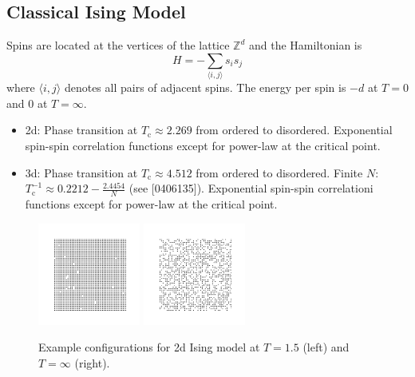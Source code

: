 \documentclass[11pt]{article}
\begin{document}
\subsection{Classical Ising Model}
Spins are located at the vertices of the lattice $\mathbb{Z}^d$ and the Hamiltonian is
\begin{equation}
    H = -\sum_{\langle i,j\rangle}s_is_j
\end{equation}
where $\langle i,j\rangle$ denotes all pairs of adjacent spins. The energy per spin is $-d$ at $T=0$ and 0 at $T=\infty$.
\begin{itemize}
    \item 2d: Phase transition at $T_\text{c}\approx 2.269$ from ordered to disordered. Exponential spin-spin correlation functions except for power-law at the critical point.
    \item 3d: Phase transition at $T_\text{c}\approx 4.512$ from ordered to disordered. Finite $N$: $T_\text{c}^{-1}\approx 0.2212-\frac{2.4454}{N}$ (see [0406135]). Exponential spin-spin correlationi functions except for power-law at the critical point.
\end{itemize}

\begin{figure}[h]
    \centering
    \includegraphics[width=0.3\textwidth]{ising_T=150.png}
    \includegraphics[width=0.3\textwidth]{ising_T=inf.png}
    \caption{Example configurations for 2d Ising model at $T=1.5$ (left) and $T=\infty$ (right).}
\end{figure}
\end{document}
